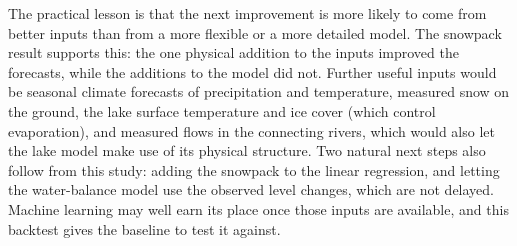 \documentclass{article}
\begin{document}
The practical lesson is that the next improvement is more likely to come from better inputs than
from a more flexible or a more detailed model. The snowpack result supports this: the one
physical addition to the inputs improved the forecasts, while the additions to the model did
not. Further useful inputs would be seasonal climate forecasts of precipitation and temperature,
measured snow on the ground, the lake surface temperature and ice cover (which control
evaporation), and measured flows in the connecting rivers, which would also let the lake model
make use of its physical structure. Two natural next steps also follow from this study: adding the
snowpack to the linear regression, and letting the water-balance model use the observed level
changes, which are not delayed. Machine learning may well earn its place once those inputs are available, and this
backtest gives the baseline to test it against.
\end{document}
